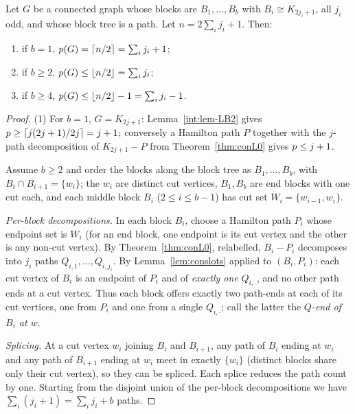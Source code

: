 \begin{theorem}\label{thm:conchain}
Let $G$ be a connected graph whose blocks are $B_1,\dots,B_b$ with
$B_i\cong K_{2j_i+1}$, all $j_i$ odd, and whose block tree is a path. Let
$n=2\sum_ij_i+1$. Then:
\begin{enumerate}[label={\rm(\roman*)},leftmargin=2em]
\item if $b=1$, $p(G)=\left\lceil n/2 \right\rceil=\sum_ij_i+1$;
\item if $b\ge2$, $p(G)\le\left\lfloor n/2 \right\rfloor=\sum_ij_i$;
\item if $b\ge4$, $p(G)\le\left\lfloor n/2 \right\rfloor-1=\sum_ij_i-1$.
\end{enumerate}
\end{theorem}

\begin{proof}
(1) For $b=1$, $G=K_{2j+1}$: Lemma~\ref{int:lem-LB2} gives
$p\ge\left\lceil j(2j+1)/2j \right\rceil=j+1$; conversely a Hamilton path $P$ together
with the $j$-path decomposition of $K_{2j+1}-P$ from Theorem~\ref{thm:conL0}
gives $p\le j+1$.

Assume $b\ge2$ and order the blocks along the block tree as
$B_1,\dots,B_b$, with $B_i\cap B_{i+1}=\{w_i\}$; the $w_i$ are distinct
cut vertices, $B_1,B_b$ are end blocks with one cut each, and each middle
block $B_i$ ($2\le i\le b-1$) has cut set $W_i=\{w_{i-1},w_i\}$.

\emph{Per-block decompositions.} In each block $B_i$, choose a Hamilton
path $P_i$ whose endpoint set is $W_i$ (for an end block, one endpoint is
its cut vertex and the other is any non-cut vertex). By
Theorem~\ref{thm:conL0}, relabelled, $B_i-P_i$ decomposes into $j_i$ paths
$Q_{i,1},\dots,Q_{i,j_i}$. By Lemma~\ref{lem:conslots} applied to
$(B_i,P_i)$: each cut vertex of $B_i$ is an endpoint of $P_i$ and of
\emph{exactly one} $Q_{i,\cdot}$, and no other path ends at a cut vertex.
Thus each block offers exactly two path-ends at each of its cut vertices,
one from $P_i$ and one from a single $Q_{i,\cdot}$; call the latter the
\emph{$Q$-end of $B_i$ at $w$}.

\emph{Splicing.} At a cut vertex $w_i$ joining $B_i$ and $B_{i+1}$, any
path of $B_i$ ending at $w_i$ and any path of $B_{i+1}$ ending at $w_i$
meet in exactly $\{w_i\}$ (distinct blocks share only their cut vertex),
so they can be spliced. Each splice reduces the path count by one.
Starting from the disjoint union of the per-block decompositions we have
$\sum_i(j_i+1)=\sum_ij_i+b$ paths.


\end{proof}
